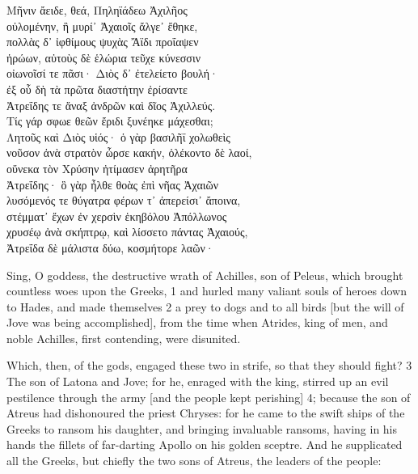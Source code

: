 \documentclass{ransom}
\begin{document}
\begin{greek}\begin{raggedright}\begin{doublespace} \large

Μῆνιν ἄειδε, θεά, Πηληϊάδεω Ἀχιλῆος \\
οὐλομένην, ἣ μυρί᾽ Ἀχαιοῖς ἄλγε᾽ ἔθηκε, \\
πολλὰς δ᾽ ἰφθίμους ψυχὰς Ἄϊδι προΐαψεν \\
ἡρώων, αὐτοὺς δὲ ἑλώρια τεῦχε κύνεσσιν \\
οἰωνοῖσί τε πᾶσι· Διὸς δ᾽ ἐτελείετο βουλή· \\
ἐξ οὗ δὴ τὰ πρῶτα διαστήτην ἐρίσαντε \\
Ἀτρεΐδης τε ἄναξ ἀνδρῶν καὶ δῖος Ἀχιλλεύς. \\
Τίς γάρ σφωε θεῶν ἔριδι ξυνέηκε μάχεσθαι; \\
Λητοῦς καὶ Διὸς υἱός· ὁ γὰρ βασιλῆϊ χολωθεὶς \\
νοῦσον ἀνὰ στρατὸν ὦρσε κακήν, ὀλέκοντο δὲ λαοί, \\
οὕνεκα τὸν Χρύσην ἠτίμασεν ἀρητῆρα \\
Ἀτρεΐδης· ὃ γὰρ ἦλθε θοὰς ἐπὶ νῆας Ἀχαιῶν \\
λυσόμενός τε θύγατρα φέρων τ᾽ ἀπερείσι᾽ ἄποινα, \\
στέμματ᾽ ἔχων ἐν χερσὶν ἑκηβόλου Ἀπόλλωνος \\
χρυσέῳ ἀνὰ σκήπτρῳ, καὶ λίσσετο πάντας Ἀχαιούς, \\
Ἀτρεΐδα δὲ μάλιστα δύω, κοσμήτορε λαῶν·

\end{doublespace}\end{raggedright}\end{greek}

\pagebreak

Sing, Ο goddess, the destructive wrath of Achilles, son of Peleus,
which brought countless woes upon the Greeks, 1 and hurled many valiant
souls of heroes down to Hades, and made themselves 2 a prey to dogs and
to all birds [but the will of Jove was being accomplished], from the
time when Atrides, king of men, and noble Achilles, first contending,
were disunited.

Which, then, of the gods, engaged these two in strife, so that they
should fight? 3 The son of Latona and Jove; for he, enraged with the
king, stirred up an evil pestilence through the army [and the people
kept perishing] 4; because the son of Atreus had dishonoured the priest
Chryses: for he came to the swift ships of the Greeks to ransom his
daughter, and bringing invaluable ransoms, having in his hands the
fillets of far-darting Apollo on his golden sceptre. And he supplicated
all the Greeks, but chiefly the two sons of Atreus, the leaders of the
people:
\end{document}
